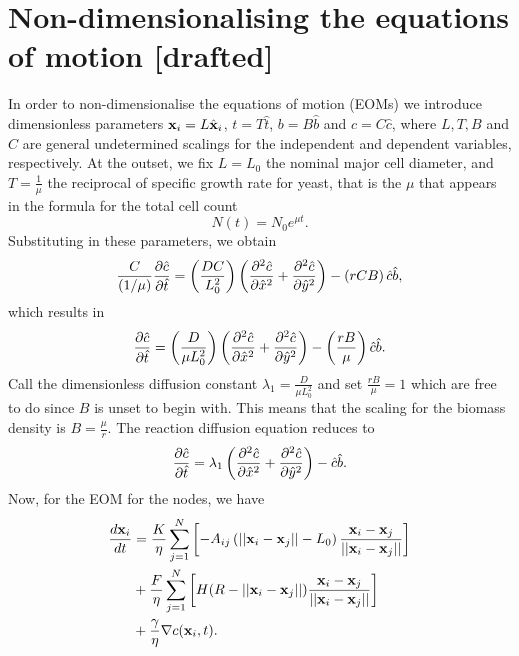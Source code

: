 \section{Non-dimensionalising the equations of motion [drafted]}
In order to non-dimensionalise the equations of motion (EOMs) we
introduce dimensionless parameters $\vb{x}_i = L\hat{\vb{x}}_i$, $t = T \hat{t}$, $b = B \hat{b}$
and $c = C \hat{c}$, where $L, T, B$ and $C$ are general undetermined scalings for the independent 
and dependent variables, respectively. At the outset, we fix $L = L_0$ the nominal major cell diameter, and
$ T = \frac{1}{\mu}$ the reciprocal of specific growth rate for yeast, that is the $\mu$ that appears in
the formula for the total cell count
\begin{equation*}  
    N(t) = N_0 e^{\mu t}.
\end{equation*}
Substituting in these parameters, we obtain 
\begin{equation*}
    \frac{C}{(1/\mu)}\pdv{\hat{c}}{\hat{t}} = \left(\frac{D C}{ L_0^2} \right)\left(\pdv[2]{\hat{c}}{\hat{x}} + \pdv[2]{\hat{c}}{\hat{y}} \right) -
      \left( r C B\right)  \hat{c}\hat{b},
\end{equation*}
which results in 
\begin{equation*}
    \pdv{\hat{c}}{\hat{t}} = \left(\frac{D}{ \mu L_0^2} \right)\left(\pdv[2]{\hat{c}}{\hat{x}} + \pdv[2]{\hat{c}}{\hat{y}} \right) -
      \left( \frac{r  B}{\mu}\right)  \hat{c}\hat{b}.
\end{equation*}
Call the dimensionless diffusion constant $\lambda_1 = \frac{D}{ \mu L_0^2}$ and 
set $\frac{r  B}{\mu}=1$ which are free to do since $B$ is unset to begin with. This means 
that the scaling for the biomass density is $B = \frac{\mu}{r}$. The reaction diffusion equation 
reduces to 
\begin{equation*}
    \pdv{\hat{c}}{\hat{t}} = \lambda_1 \left(\pdv[2]{\hat{c}}{\hat{x}} + \pdv[2]{\hat{c}}{\hat{y}} \right) -
      \hat{c}\hat{b}.
\end{equation*}
Now, for the EOM for the nodes, we have
\begin{equation*}
    \begin{split}
        \frac{d \vb{x}_i}{dt} &= 
        \frac{K}{ \eta}\sum_{j = 1}^N   \left[ - A_{ij} \left( ||\vb{x}_i - \vb{x}_j|| - L_0\right) \frac{\vb{x}_i - \vb{x}_j}{||\vb{x}_i - \vb{x}_j||} \right]\\
         &+ \frac{F}{ \eta}\sum_{j = 1}^N \left[ H(R - ||\vb{x}_i - \vb{x}_j||) \frac{\vb{x}_i - \vb{x}_j}{||\vb{x}_i - \vb{x}_j||}     \right]\\ 
         &+ \frac{\gamma}{\eta} \nabla c (\vb{x}_i, t).
    \end{split}
\end{equation*}
